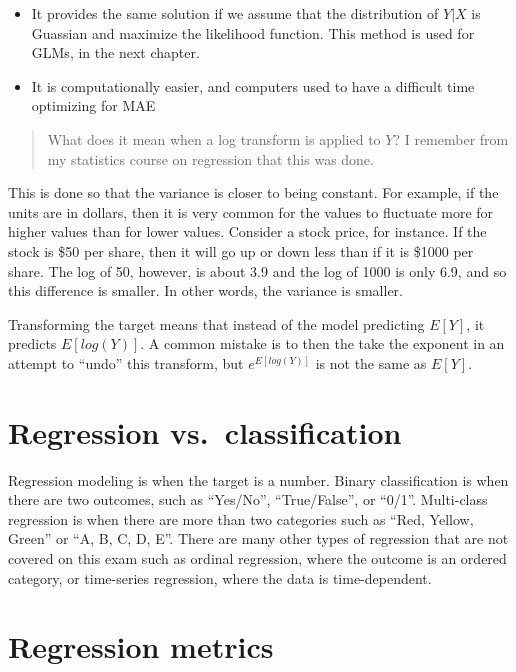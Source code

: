 \documentclass[openany]{book}
\providecommand{\tightlist}{%
  \setlength{\itemsep}{0pt}\setlength{\parskip}{0pt}}
\begin{document}
\begin{itemize}
\tightlist
\item
  It provides the same solution if we assume that the distribution of \(Y|X\) is Guassian and maximize the likelihood function. This method is used for GLMs, in the next chapter.
\item
  It is computationally easier, and computers used to have a difficult time optimizing for MAE
\end{itemize}

\begin{quote}
What does it mean when a log transform is applied to \(Y\)? I remember from my statistics course on regression that this was done.
\end{quote}

This is done so that the variance is closer to being constant. For example, if the units are in dollars, then it is very common for the values to fluctuate more for higher values than for lower values. Consider a stock price, for instance. If the stock is \$50 per share, then it will go up or down less than if it is \$1000 per share. The log of 50, however, is about 3.9 and the log of 1000 is only 6.9, and so this difference is smaller. In other words, the variance is smaller.

Transforming the target means that instead of the model predicting \(E[Y]\), it predicts \(E[log(Y)]\). A common mistake is to then the take the exponent in an attempt to ``undo'' this transform, but \(e^{E[log(Y)]}\) is not the same as \(E[Y]\).

\hypertarget{regression-vs.-classification}{%
\section{Regression vs.~classification}\label{regression-vs.-classification}}

Regression modeling is when the target is a number. Binary classification is when there are two outcomes, such as ``Yes/No'', ``True/False'', or ``0/1''. Multi-class regression is when there are more than two categories such as ``Red, Yellow, Green'' or ``A, B, C, D, E''. There are many other types of regression that are not covered on this exam such as ordinal regression, where the outcome is an ordered category, or time-series regression, where the data is time-dependent.

\hypertarget{regression-metrics}{%
\section{Regression metrics}\label{regression-metrics}}
\end{document}
